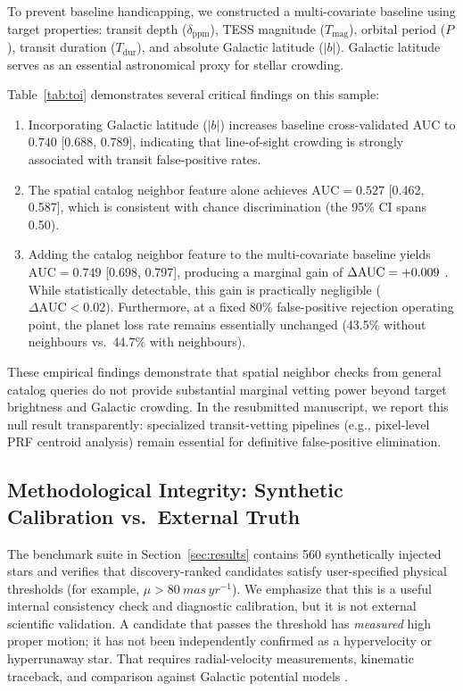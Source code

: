 \documentclass[12pt]{elsarticle}
\begin{document}
To prevent baseline handicapping, we constructed a multi-covariate baseline using target properties: transit depth ($\delta_{\mathrm{ppm}}$), TESS magnitude ($T_{\mathrm{mag}}$), orbital period ($P$), transit duration ($T_{\mathrm{dur}}$), and absolute Galactic latitude ($|b|$). Galactic latitude serves as an essential astronomical proxy for stellar crowding.



Table~\ref{tab:toi} demonstrates several critical findings on this sample:
\begin{enumerate}
    \item Incorporating Galactic latitude ($|b|$) increases baseline cross-validated AUC to $0.740$ [0.688, 0.789], indicating that line-of-sight crowding is strongly associated with transit false-positive rates.
    \item The spatial catalog neighbor feature alone achieves $\text{AUC} = 0.527$ [0.462, 0.587], which is consistent with chance discrimination (the 95\% CI spans 0.50).
    \item Adding the catalog neighbor feature to the multi-covariate baseline yields $\text{AUC} = 0.749$ [0.698, 0.797], producing a marginal gain of $\Delta\text{AUC} = +0.009{}$ \toiDeltaCI{}. While statistically detectable, this gain is practically negligible ($\Delta\text{AUC} < 0.02$). Furthermore, at a fixed 80\% false-positive rejection operating point, the planet loss rate remains essentially unchanged (43.5\% without neighbours vs.\ 44.7\% with neighbours).
\end{enumerate}

These empirical findings demonstrate that spatial neighbor checks from general catalog queries do not provide substantial marginal vetting power beyond target brightness and Galactic crowding. In the resubmitted manuscript, we report this null result transparently: specialized transit-vetting pipelines (e.g., pixel-level PRF centroid analysis) remain essential for definitive false-positive elimination.

\subsection{Methodological Integrity: Synthetic Calibration vs.\ External Truth}
\label{sec:synthetic}

The benchmark suite in Section~\ref{sec:results} contains 560 synthetically injected stars and verifies that discovery-ranked candidates satisfy user-specified physical thresholds (for example, $\mu > \SI{80}{mas\,yr^{-1}}$). We emphasize that this is a useful internal consistency check and diagnostic calibration, but it is not external scientific validation. A candidate that passes the threshold has \emph{measured} high proper motion; it has not been independently confirmed as a hypervelocity or hyperrunaway star. That requires radial-velocity measurements, kinematic traceback, and comparison against Galactic potential models \citep{Brown2015, ElBadry2021}. 
\end{document}

